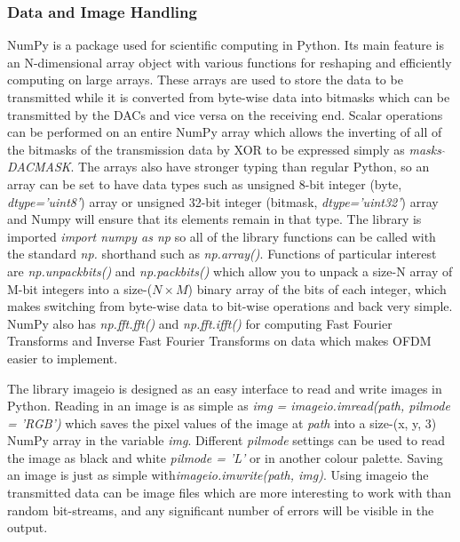 \documentclass[../main.tex]{subfiles}
\begin{document}
\subsubsection{Data and Image Handling}

NumPy is a package used for scientific computing in Python.
Its main feature is an N-dimensional array object with various functions for reshaping and efficiently computing on large arrays.
These arrays are used to store the data to be transmitted while it is converted from byte-wise data into bitmasks which can be transmitted by the DACs and vice versa on the receiving end.
Scalar operations can be performed on an entire NumPy array which allows the inverting of all of the bitmasks of the transmission data by XOR to be expressed simply as \textit{masks $\hat{}$ DAC\textunderscore MASK}.
The arrays also have stronger typing than regular Python, so an array can be set to have data types such as unsigned 8-bit integer (byte, \textit{dtype='uint8'}) array or unsigned 32-bit integer (bitmask, \textit{dtype='uint32'}) array and Numpy will ensure that its elements remain in that type.
The library is imported \textit{import numpy as np} so all of the library functions can be called with the standard \textit{np.} shorthand such as \textit{np.array()}.
Functions of particular interest are \textit{np.unpackbits()} and \textit{np.packbits()} which allow you to unpack a size-N array of M-bit integers into a size-($N\times M$) binary array of the bits of each integer, which makes switching from byte-wise data to bit-wise operations and back very simple.
NumPy also has \textit{np.fft.fft()} and \textit{np.fft.ifft()} for computing Fast Fourier Transforms and Inverse Fast Fourier Transforms on data which makes OFDM easier to implement.

The library imageio is designed as an easy interface to read and write images in Python.
Reading in an image is as simple as \textit{img = imageio.imread(path, pilmode = 'RGB')} which saves the pixel values of the image at \textit{path} into a size-(x, y, 3) NumPy array in the variable \textit{img}.
Different \textit{pilmode} settings can be used to read the image as black and white \textit{pilmode = 'L'} or in another colour palette.
Saving an image is just as simple with\textit{imageio.imwrite(path, img)}.
Using imageio the transmitted data can be image files which are more interesting to work with than random bit-streams, and any significant number of errors will be visible in the output.\\
\end{document}
